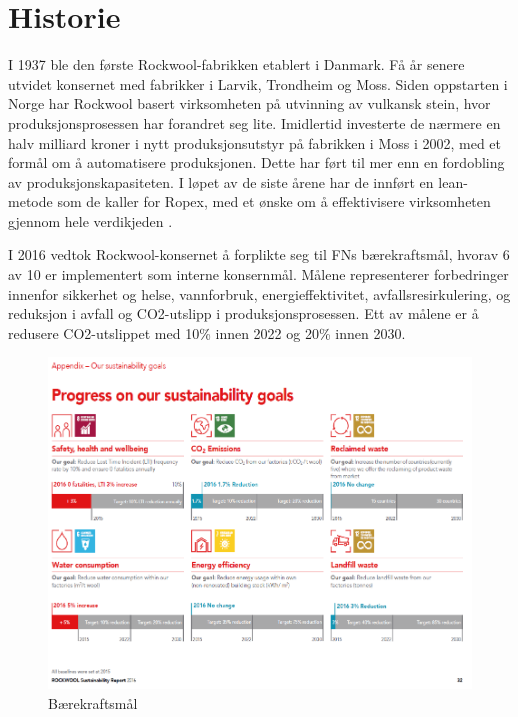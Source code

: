 \section{Historie}
I 1937 ble den første Rockwool-fabrikken etablert i Danmark. Få år senere utvidet konsernet med fabrikker i Larvik, Trondheim og Moss. Siden oppstarten i Norge har Rockwool basert virksomheten på utvinning av vulkansk stein, hvor produksjonsprosessen har forandret seg lite. Imidlertid investerte de nærmere en halv milliard kroner i nytt produksjonsutstyr på fabrikken i Moss i 2002, med et formål om å automatisere produksjonen. Dette har ført til mer enn en fordobling av produksjonskapasiteten. I løpet av de siste årene har de innført en lean-metode som de kaller for Ropex, med et ønske om å effektivisere virksomheten gjennom hele verdikjeden \cite{dagsavisen}.

\indent \newline
I 2016 vedtok Rockwool-konsernet å forplikte seg til FNs bærekraftsmål, hvorav 6 av 10 er implementert som interne konsernmål. Målene representerer forbedringer innenfor sikkerhet og helse, vannforbruk, energieffektivitet, avfallsresirkulering, og reduksjon i avfall og CO2-utslipp i produksjonsprosessen. Ett av målene er å redusere CO2-utslippet med 10\% innen 2022 og 20\% innen 2030.

\begin{figure}[H]
\centering
\includegraphics [scale=0.9]{bilder/baerkraftsmal.png}
\caption{Bærekraftsmål}
\label{fig:baerkraftsmal}
\end{figure}


